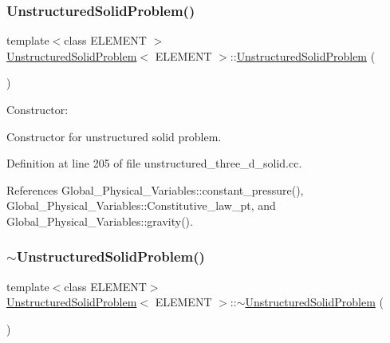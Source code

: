 \subsubsection{\texorpdfstring{Unstructured\+Solid\+Problem()}{UnstructuredSolidProblem()}\hspace{0.1cm}{\footnotesize\ttfamily [1/2]}}
{\footnotesize\ttfamily template$<$class E\+L\+E\+M\+E\+NT $>$ \\
\hyperlink{classUnstructuredSolidProblem}{Unstructured\+Solid\+Problem}$<$ E\+L\+E\+M\+E\+NT $>$\+::\hyperlink{classUnstructuredSolidProblem}{Unstructured\+Solid\+Problem} (\begin{DoxyParamCaption}{ }\end{DoxyParamCaption})}



Constructor\+: 

Constructor for unstructured solid problem. 

Definition at line 205 of file unstructured\+\_\+three\+\_\+d\+\_\+solid.\+cc.



References Global\+\_\+\+Physical\+\_\+\+Variables\+::constant\+\_\+pressure(), Global\+\_\+\+Physical\+\_\+\+Variables\+::\+Constitutive\+\_\+law\+\_\+pt, and Global\+\_\+\+Physical\+\_\+\+Variables\+::gravity().

\mbox{\label{classUnstructuredSolidProblem_a25fe105d949498bf8f7c15aff96a7d00}} 
\subsubsection{\texorpdfstring{$\sim$\+Unstructured\+Solid\+Problem()}{~UnstructuredSolidProblem()}\hspace{0.1cm}{\footnotesize\ttfamily [1/2]}}
{\footnotesize\ttfamily template$<$class E\+L\+E\+M\+E\+NT$>$ \\
\hyperlink{classUnstructuredSolidProblem}{Unstructured\+Solid\+Problem}$<$ E\+L\+E\+M\+E\+NT $>$\+::$\sim$\hyperlink{classUnstructuredSolidProblem}{Unstructured\+Solid\+Problem} (\begin{DoxyParamCaption}{ }\end{DoxyParamCaption})\hspace{0.3cm}{\ttfamily [inline]}}



